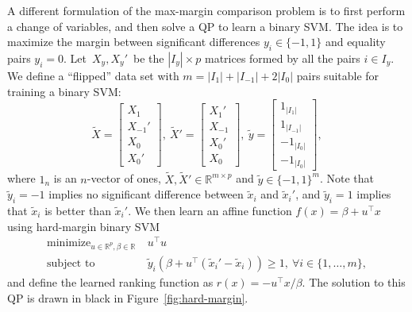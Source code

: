\documentclass{article}
\newcommand{\RR}{\mathbb R}
\DeclareMathOperator*{\minimize}{minimize}
\begin{document}
\begin{figure*}[b!]
  \centering
  
  \vskip -0.8cm
  \caption{The separable LP and QP comparison problems. \textbf{Left}:
    the difference vectors $x'-x$ of the original data and the optimal
    solution to the LP (\ref{eq:max-margin-lp}). \textbf{Middle}: for
    the unscaled flipped data $\tilde x'-\tilde x$ (\ref{eq:tilde}),
    the LP is not the same as the QP
    (\ref{eq:max-margin-qp-tilde}). \textbf{Right}: for the scaled flipped
    data, the QP is equivalent to the LP.}
  \label{fig:hard-margin}
\end{figure*}

A different formulation of the max-margin comparison problem is to
first perform a change of variables, and then solve a QP to learn a
binary SVM. The idea is to maximize the margin between significant
differences $y_i\in\{-1,1\}$ and equality pairs
$y_i=0$. Let~$X_y,X_y'$~be the $|I_y|\times p$ matrices formed by all
the pairs $i\in I_y$. We define a ``flipped'' data set with
$m=|I_1|+|I_{-1}|+2|I_0|$ pairs suitable for training a binary SVM:
\begin{equation}
\label{eq:tilde}
  \tilde X = \left[
    \begin{array}{c}
      X_1 \\
      X_{-1}'\\
      X_0\\
      X_0'
    \end{array}
  \right],\ 
  \tilde X' = \left[
    \begin{array}{c}
      X_1' \\
      X_{-1}\\
      X_0'\\
      X_0
    \end{array}
  \right],\ 
  \tilde y = \left[
    \begin{array}{c}
      1_{|I_1|} \\
      1_{|I_{-1}|}\\
      -1_{|I_0|}\\
      -1_{|I_0|}
    \end{array}
  \right],
\end{equation}
where $1_n$ is an $n$-vector of ones, $\tilde X,\tilde
X'\in\RR^{m\times p}$ and $\tilde y\in\{-1,1\}^m$. Note that $\tilde
y_i=-1$ implies no significant difference between $\tilde x_i$ and
$\tilde x_i'$, and $\tilde y_i=1$ implies that $\tilde x_i$ is better
than $\tilde x_i'$. We then learn an affine function
$f(x)=\beta+u^\intercal x$ using hard-margin binary SVM
\begin{equation}
  \label{eq:max-margin-qp-tilde}
  \begin{aligned}
    \minimize_{u\in\RR^p, \beta\in\RR}\ & u^\intercal u  \\
    \text{subject to}\ & 
    \tilde y_i (\beta + u^\intercal( \tilde x_i'-\tilde x_i) ) \geq 1,
    \ \forall i\in\{1,\dots,m\},
  \end{aligned}
\end{equation}
and define the learned ranking function as $r(x) = -u^\intercal
x/\beta$. The solution to this QP is drawn in
black in Figure~\ref{fig:hard-margin}.
\end{document}
